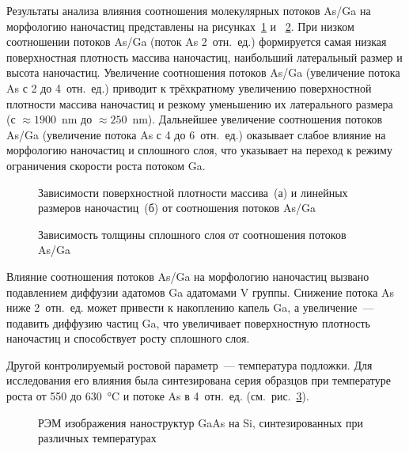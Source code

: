 Результаты анализа влияния соотношения молекулярных потоков As/Ga на морфологию
наночастиц представлены на рисунках~\cref{fig:tab_2} и ~\cref{fig:tab_2_3}. При
низком соотношении потоков As/Ga (поток As 2~отн.~ед.) формируется самая низкая
поверхностная плотность массива наночастиц, наибольший латеральный размер и
высота наночастиц. Увеличение соотношения потоков As/Ga (увеличение потока As с
2 до 4~отн.~ед.) приводит к трёхкратному увеличению поверхностной плотности
массива наночастиц и резкому уменьшению их латерального размера (с \(\approx
1900\)~\si{\nano\metre} до \(\approx 250\)~\si{\nano\metre}). Дальнейшее
увеличение соотношения потоков As/Ga (увеличение потока As с 4 до 6~отн.~ед.)
оказывает слабое влияние на морфологию наночастиц и сплошного слоя, что
указывает на переход к режиму ограничения скорости роста потоком Ga.

\begin{figure}[ht]  
			\caption{Зависимости поверхностной плотности массива~(а) и линейных
				размеров наночастиц~(б)  от соотношения потоков As/Ga}\label{fig:tab_2}
			\end{figure}

\begin{figure}[ht]  
		\caption{Зависимость толщины сплошного слоя от соотношения потоков
	As/Ga}\label{fig:tab_2_3} \end{figure}

Влияние соотношения потоков As/Ga на морфологию наночастиц вызвано подавлением
диффузии адатомов Ga адатомами V группы. Снижение потока As ниже 2~отн.~ед.
может привести к накоплению капель Ga, а увеличение~--- подавить диффузию
частиц Ga, что увеличивает поверхностную плотность наночастиц и способствует
росту сплошного слоя.

Другой контролируемый ростовой параметр~--- температура подложки. Для
исследования его влияния была синтезирована серия образцов при температуре
роста от 550 до 630~\si{\degreeCelsius} и потоке As в 4~отн.~ед.
(см.~рис.~\cref{fig:Image_32}).

\begin{figure}[ht] 
				 \caption{РЭМ изображения наноструктур GaAs на Si,
			синтезированных при различных температурах}\label{fig:Image_32}
		\end{figure}

